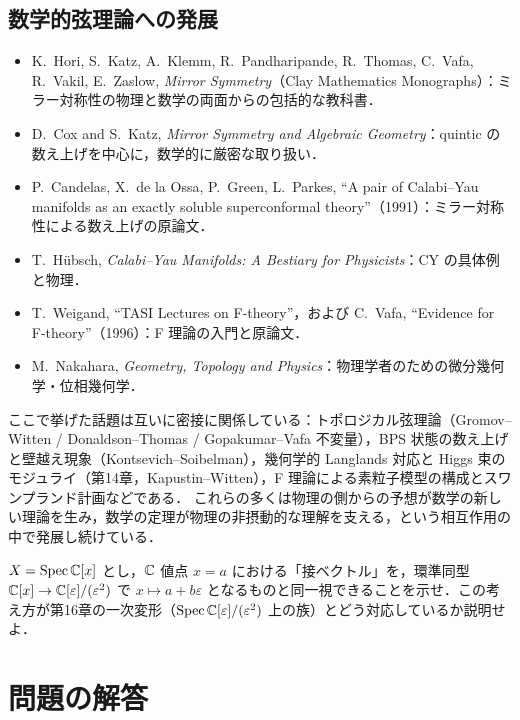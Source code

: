 \subsection{数学的弦理論への発展}

\begin{itemize}
\item K.~Hori, S.~Katz, A.~Klemm, R.~Pandharipande, R.~Thomas, C.~Vafa, R.~Vakil, E.~Zaslow, \textit{Mirror Symmetry}（Clay Mathematics Monographs）：ミラー対称性の物理と数学の両面からの包括的な教科書．
\item D.~Cox and S.~Katz, \textit{Mirror Symmetry and Algebraic Geometry}：quintic の数え上げを中心に，数学的に厳密な取り扱い．
\item P.~Candelas, X.~de la Ossa, P.~Green, L.~Parkes, ``A pair of Calabi--Yau manifolds as an exactly soluble superconformal theory''（1991）：ミラー対称性による数え上げの原論文．
\item T.~H\"ubsch, \textit{Calabi--Yau Manifolds: A Bestiary for Physicists}：CY の具体例と物理．
\item T.~Weigand, ``TASI Lectures on F-theory''，および C.~Vafa, ``Evidence for F-theory''（1996）：F 理論の入門と原論文．
\item M.~Nakahara, \textit{Geometry, Topology and Physics}：物理学者のための微分幾何学・位相幾何学．
\end{itemize}

\begin{physbox}[現代の研究との関わり]
ここで挙げた話題は互いに密接に関係している：トポロジカル弦理論（Gromov--Witten / Donaldson--Thomas / Gopakumar--Vafa 不変量），BPS 状態の数え上げと壁越え現象（Kontsevich--Soibelman），幾何学的 Langlands 対応と Higgs 束のモジュライ（第14章，Kapustin--Witten），F 理論による素粒子模型の構成とスワンプランド計画などである．
これらの多くは物理の側からの予想が数学の新しい理論を生み，数学の定理が物理の非摂動的な理解を支える，という相互作用の中で発展し続けている．
\end{physbox}

$X=\operatorname{Spec}\mathbb{C}[x]$ とし，$\mathbb{C}$ 値点 $x=a$ における「接ベクトル」を，環準同型 $\mathbb{C}[x]\to\mathbb{C}[\varepsilon]/(\varepsilon^2)$ で $x\mapsto a+b\varepsilon$ となるものと同一視できることを示せ．この考え方が第16章の一次変形（$\operatorname{Spec}\mathbb{C}[\varepsilon]/(\varepsilon^2)$ 上の族）とどう対応しているか説明せよ．

\section*{問題の解答}

